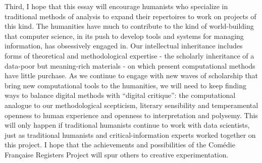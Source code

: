 \documentclass[	DIV=calc,%
							paper=a4,%
							fontsize=11pt,%
							twocolumn]{scrartcl}	 					%
\begin{document}
Third, I hope that this essay will encourage humanists who specialize in traditional methods of analysis to expand their repertoires to work on projects of this kind.  The humanities have much to contribute to the kind of world-building that computer science, in its push to develop tools and systems for managing information, has obsessively engaged in.  Our intellectual inheritance includes forms of theoretical and methodological expertise - the scholarly inheritance of a data-poor but meaning-rich materials - on which present computational methods have little purchase.  As we continue to engage with new waves of scholarship that bring new computational tools to the humanities, we will need to keep finding ways to balance digital methods with ``digital critique'': the computational analogue to our methodological scepticism, literary sensibility and temperamental openness to human experience and openness to interpretation and polysemy.  This will only happen if traditional humanists continue to work with data scientists, just as traditional humanists and critical-information experts worked together on this project.  I hope that the achievements and possibilities of the Comédie Française Registers Project will spur others to creative experimentation.

\printbibliography
\end{document}
